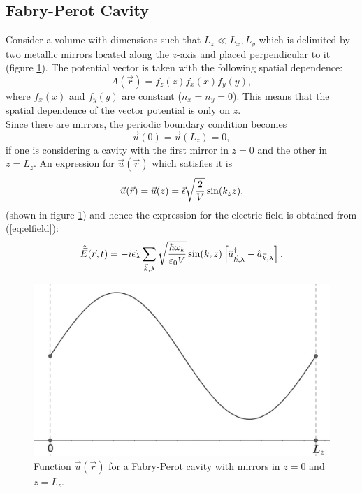 \subsection{Fabry-Perot Cavity}

Consider a volume with dimensions such that $L_z \ll L_x, L_y $ which is delimited by two metallic mirrors located along the $z$-axis and placed perpendicular to it (figure \ref{fig:fp}).
The potential vector is taken with the following spatial dependence:
$${A(\vec{r})} = f_z (z) f_x (x) f_y (y),$$
where $f_x (x)$ and $f_y (y)$ are constant ($n_x =n_y = 0$). This means that the spatial dependence of the vector potential is only on $z$. \\
Since there are mirrors, the periodic boundary condition becomes
\begin{equation}
   \vec{u}(0) = \vec{u}(L_z) = 0, 
\end{equation}
if one is considering a cavity with the first mirror in $z = 0$ and the other in $z = L_z$. An expression for $\vec{u}(\vec{r})$ which satisfies it is 
\begin{equation}
    \vec{u}_{}(\vec{r})= \vec{u}(z) = \vec{\epsilon}\sqrt{\frac{2}{V}} \sin(k_z z),
\end{equation}
(shown in figure \ref{fig:fp}) and hence the expression for the electric field is obtained from (\ref{eq:elfield}):
\begin{equation}
    \hat{\vec{E}}(\vec{r}, t) = -i \vec{\epsilon}_{\lambda} \sum\limits_{\vec{k}, \lambda} \sqrt{\frac{\hbar \omega_k}{ \varepsilon_0 V}}  \sin(k_z z) \left[ \hat{a}^{\dagger}_{\vec{k}, \lambda}  - \hat{a}_{\vec{k}, \lambda} \right]. 
    \label{eq:efFP}
\end{equation}

\begin{figure}[H]
\centering
    \includegraphics[width=0.65\linewidth]{images/Fabry_Perot.png}
    \caption{Function $\vec{u}(\vec{r})$ for a Fabry-Perot cavity with mirrors in $z = 0$ and $z = L_z$.}
    \label{fig:fp}
\end{figure}

